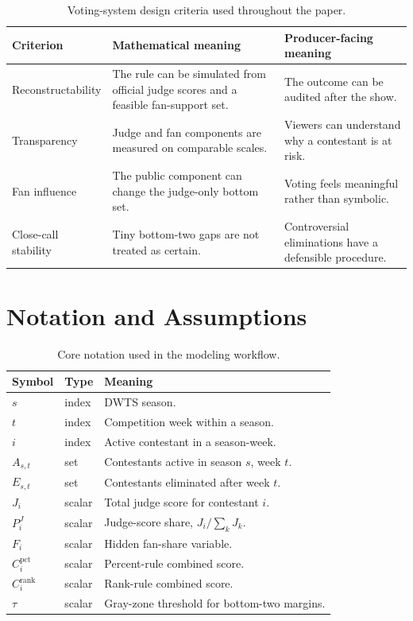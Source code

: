 \documentclass[12pt]{article}
\begin{document}
\begin{table}[H]
  \centering
  \caption{Voting-system design criteria used throughout the paper.}
  \label{tab:criteria}
  \begin{tabularx}{0.96\linewidth}{lXX}
    \toprule
    Criterion & Mathematical meaning & Producer-facing meaning \\
    \midrule
    Reconstructability & The rule can be simulated from official judge scores and
    a feasible fan-support set. & The outcome can be audited after the show. \\
    Transparency & Judge and fan components are measured on comparable scales. &
    Viewers can understand why a contestant is at risk. \\
    Fan influence & The public component can change the judge-only bottom set. &
    Voting feels meaningful rather than symbolic. \\
    Close-call stability & Tiny bottom-two gaps are not treated as certain. &
    Controversial eliminations have a defensible procedure. \\
    \bottomrule
  \end{tabularx}
\end{table}

\section{Notation and Assumptions}

\begin{table}[H]
  \centering
  \caption{Core notation used in the modeling workflow.}
  \label{tab:notation}
  \begin{tabularx}{0.96\linewidth}{llX}
    \toprule
    Symbol & Type & Meaning \\
    \midrule
    $s$ & index & DWTS season. \\
    $t$ & index & Competition week within a season. \\
    $i$ & index & Active contestant in a season-week. \\
    $A_{s,t}$ & set & Contestants active in season $s$, week $t$. \\
    $E_{s,t}$ & set & Contestants eliminated after week $t$. \\
    $J_i$ & scalar & Total judge score for contestant $i$. \\
    $P^J_i$ & scalar & Judge-score share, $J_i/\sum_k J_k$. \\
    $F_i$ & scalar & Hidden fan-share variable. \\
    $C_i^{\mathrm{pct}}$ & scalar & Percent-rule combined score. \\
    $C_i^{\mathrm{rank}}$ & scalar & Rank-rule combined score. \\
    $\tau$ & scalar & Gray-zone threshold for bottom-two margins. \\
    \bottomrule
  \end{tabularx}
\end{table}
\end{document}
